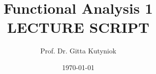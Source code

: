 \begin{titlepage}
\title{{\bf Functional Analysis 1}\\[2cm]\uppercase{\small {Lecture Script}}}
\author{Prof. Dr. Gitta Kutyniok\\[10cm]}
\date{\today}
\maketitle
\end{titlepage}